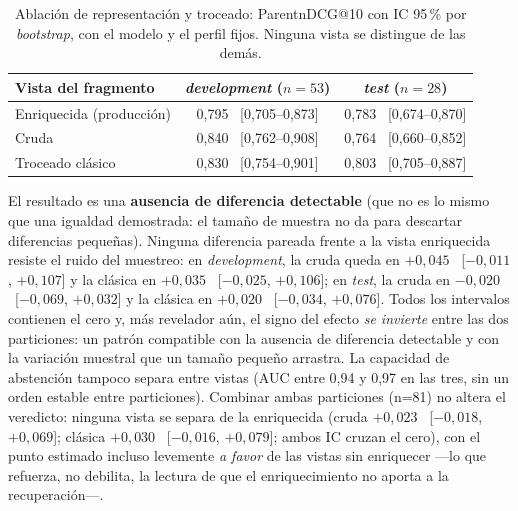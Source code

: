 \begin{table}[htbp]
    \centering
    \small
    \renewcommand{\arraystretch}{1.2}
    \caption{Ablación de representación y troceado: ParentnDCG@10 con IC 95\,\% por \emph{bootstrap}, con el modelo y el perfil fijos. Ninguna vista se distingue de las demás.}
    \label{tab:ablacion-representacion}
    \begin{tabular}{|l|c|c|}
        \hline
        \textbf{Vista del fragmento} & \textbf{\emph{development} ($n=53$)} & \textbf{\emph{test} ($n=28$)} \\
        \hline
        Enriquecida (producción) & 0,795 \ [0,705--0,873] & 0,783 \ [0,674--0,870] \\
        Cruda                    & 0,840 \ [0,762--0,908] & 0,764 \ [0,660--0,852] \\
        Troceado clásico         & 0,830 \ [0,754--0,901] & 0,803 \ [0,705--0,887] \\
        \hline
    \end{tabular}
\end{table}

El resultado es una \textbf{ausencia de diferencia detectable} (que no es lo mismo que una igualdad demostrada: el tamaño de muestra no da para descartar diferencias pequeñas). Ninguna diferencia pareada frente a la vista enriquecida resiste el ruido del muestreo: en \emph{development}, la cruda queda en $+0{,}045$ \ [$-0{,}011$, $+0{,}107$] y la clásica en $+0{,}035$ \ [$-0{,}025$, $+0{,}106$]; en \emph{test}, la cruda en $-0{,}020$ \ [$-0{,}069$, $+0{,}032$] y la clásica en $+0{,}020$ \ [$-0{,}034$, $+0{,}076$]. Todos los intervalos contienen el cero y, más revelador aún, el signo del efecto \emph{se invierte} entre las dos particiones: un patrón compatible con la ausencia de diferencia detectable y con la variación muestral que un tamaño pequeño arrastra. La capacidad de abstención tampoco separa entre vistas (AUC entre 0,94 y 0,97 en las tres, sin un orden estable entre particiones). Combinar ambas particiones (n=81) no altera el veredicto: ninguna vista se separa de la enriquecida (cruda $+0{,}023$ \ [$-0{,}018$, $+0{,}069$]; clásica $+0{,}030$ \ [$-0{,}016$, $+0{,}079$]; ambos IC cruzan el cero), con el punto estimado incluso levemente \emph{a favor} de las vistas sin enriquecer —lo que refuerza, no debilita, la lectura de que el enriquecimiento no aporta a la recuperación—.

